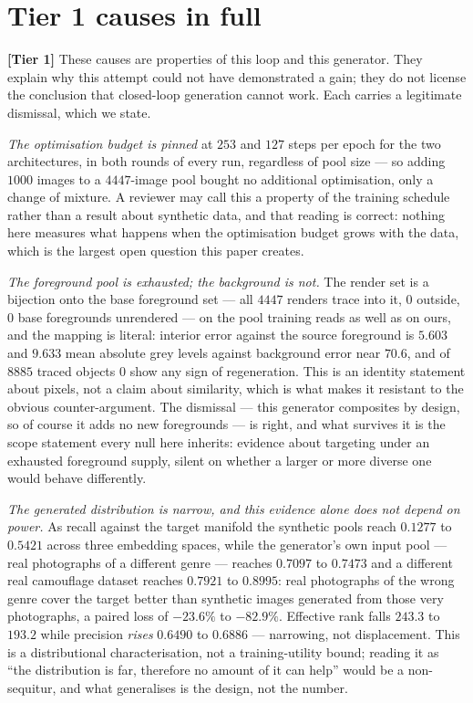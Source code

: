 \documentclass{article} %
\begin{document}
\section{Tier 1 causes in full}
\label{app:tier1}

\textbf{[Tier 1]} These causes are properties of this loop and this generator. They explain why this
attempt could not have demonstrated a gain; they do not license the conclusion that closed-loop
generation cannot work. Each carries a legitimate dismissal, which we state.

\emph{The optimisation budget is pinned} at $253$ and $127$ steps per epoch for the two
architectures, in both rounds of every run, regardless of pool size --- so adding $1000$ images to a
$4447$-image pool bought no additional optimisation, only a change of mixture. A reviewer may call
this a property of the training schedule rather than a result about synthetic data, and that reading
is correct: nothing here measures what happens when the optimisation budget grows with the data,
which is the largest open question this paper creates.

\emph{The foreground pool is exhausted; the background is not.} The render set is a bijection onto the
base foreground set --- all $4447$ renders trace into it, $0$ outside, $0$ base foregrounds unrendered
--- on the pool training reads as well as on ours, and the mapping is literal: interior error against
the source foreground is $5.603$ and $9.633$ mean absolute grey levels against background error near
$70.6$, and of $8885$ traced objects $0$ show any sign of regeneration. This is an identity statement
about pixels, not a claim about similarity, which is what makes it resistant to the obvious
counter-argument. The dismissal --- this generator composites by design, so of course it adds no new
foregrounds --- is right, and what survives it is the scope statement every null here inherits:
evidence about targeting under an exhausted foreground supply, silent on whether a larger or more
diverse one would behave differently.

\emph{The generated distribution is narrow, and this evidence alone does not depend on power.} As
recall against the target manifold the synthetic pools reach $0.1277$ to $0.5421$ across three
embedding spaces, while the generator's own input pool --- real photographs of a different genre ---
reaches $0.7097$ to $0.7473$ and a different real camouflage dataset reaches $0.7921$ to $0.8995$: real
photographs of the wrong genre cover the target better than synthetic images generated from those very
photographs, a paired loss of $-23.6\%$ to $-82.9\%$. Effective rank falls $243.3$ to $193.2$ while
precision \emph{rises} $0.6490$ to $0.6886$ --- narrowing, not displacement. This is a distributional
characterisation, not a training-utility bound; reading it as ``the distribution is far, therefore no
amount of it can help'' would be a non-sequitur, and what generalises is the design, not the number.
\end{document}
